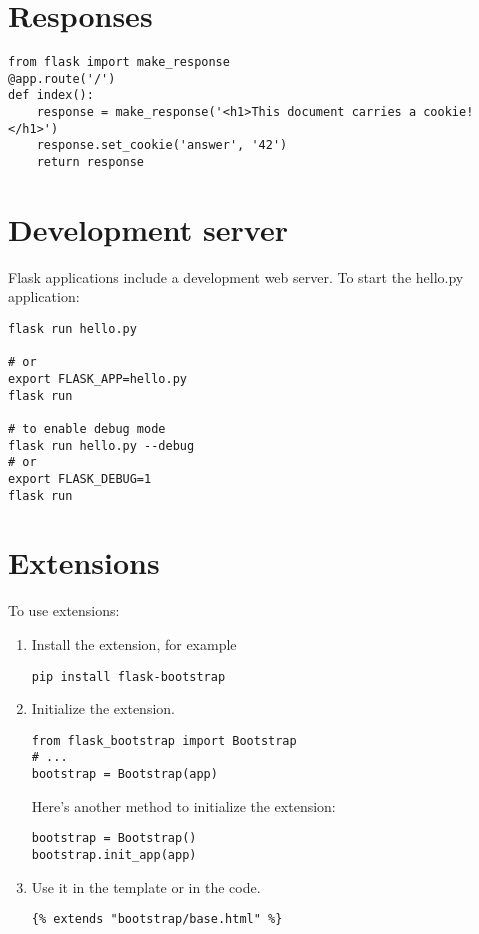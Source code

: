 \section{Responses}
\label{sec:responses}

\begin{lstlisting}
from flask import make_response
@app.route('/')
def index():
    response = make_response('<h1>This document carries a cookie!</h1>')
    response.set_cookie('answer', '42')
    return response
\end{lstlisting}

\section{Development server}
\label{sec:development-server}

Flask applications include a development web server.
To start the hello.py application:
\begin{lstlisting}
flask run hello.py

# or
export FLASK_APP=hello.py
flask run

# to enable debug mode
flask run hello.py --debug
# or
export FLASK_DEBUG=1
flask run
\end{lstlisting}

\section{Extensions}
\label{sec:extensions}

To use extensions:
\begin{enumerate}
\item Install the extension, for example
\begin{lstlisting}
pip install flask-bootstrap
\end{lstlisting}
  
\item Initialize the extension.
\begin{lstlisting}
from flask_bootstrap import Bootstrap
# ...
bootstrap = Bootstrap(app)
\end{lstlisting}
  
  Here's another method to initialize the extension:
\begin{lstlisting}
bootstrap = Bootstrap()
bootstrap.init_app(app)
\end{lstlisting}
\item Use it in the template or in the code.
\begin{lstlisting}
{% extends "bootstrap/base.html" %}
\end{lstlisting}
\end{enumerate}

